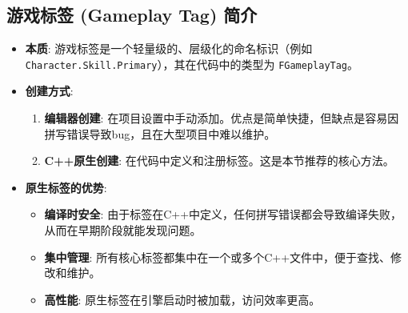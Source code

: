 \documentclass[10pt,CJKmath]{zhbook-v1}
\begin{document}
\subsection{游戏标签 (Gameplay Tag) 简介}
\begin{itemize}
    \item \textbf{本质}: 游戏标签是一个轻量级的、层级化的命名标识（例如 \texttt{Character.Skill.Primary}），其在代码中的类型为 \texttt{FGameplayTag}。
    \item \textbf{创建方式}:
    \begin{enumerate}
        \item \textbf{编辑器创建}: 在项目设置中手动添加。优点是简单快捷，但缺点是容易因拼写错误导致bug，且在大型项目中难以维护。
        \item \textbf{C++原生创建}: 在代码中定义和注册标签。这是本节推荐的核心方法。
    \end{enumerate}
    \item \textbf{原生标签的优势}:
    \begin{itemize}
        \item \textbf{编译时安全}: 由于标签在C++中定义，任何拼写错误都会导致编译失败，从而在早期阶段就能发现问题。
        \item \textbf{集中管理}: 所有核心标签都集中在一个或多个C++文件中，便于查找、修改和维护。
        \item \textbf{高性能}: 原生标签在引擎启动时被加载，访问效率更高。
    \end{itemize}
\end{itemize}
\end{document}
